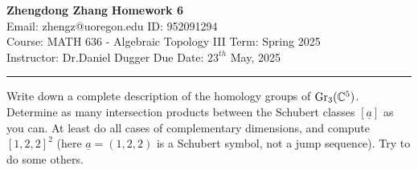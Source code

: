 \documentclass[letterpaper, 12pt]{article}
\begin{document}
\noindent
\large\textbf{Zhengdong Zhang} \hfill \textbf{Homework 6}  \\
Email: zhengz@uoregon.edu \hfill ID: 952091294  \\
\normalsize Course: MATH 636 - Algebraic Topology III \hfill Term: Spring 2025 \\
Instructor: Dr.Daniel Dugger \hfill Due Date: $23^{th}$ May, 2025  \\
\noindent\rule{7in}{2.8pt}

\begin{problem}{1}
Write down a complete description of the homology groups of \(\text{Gr}_3(\mathbb{C}^5)\). Determine as many intersection products between the Schubert classes \([\underline{a}]\) as you can. At least do all cases of complementary dimensions, and compute \([1,2,2]^2\) (here \(\underline{a}=(1,2,2)\) is a Schubert symbol, not a jump sequence). Try to do some others.
\end{problem} 
\end{document}
